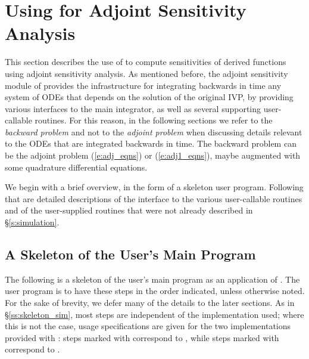 \section{Using {\cvodes} for Adjoint Sensitivity Analysis}\label{s:adjoint}

This section describes the use of {\cvodes} to compute sensitivities of derived 
functions using adjoint sensitivity analysis. As mentioned before, the adjoint
sensitivity module of {\cvodes} provides the infrastructure for integrating
backwards in time any system of ODEs that depends on the solution of the original
IVP, by providing various interfaces to the main {\cvodes} integrator, as well 
as several supporting user-callable routines. For this reason, in the following
sections we refer to the {\em backward problem} and not to the 
{\em adjoint problem} when discussing details relevant to the ODEs that
are integrated backwards in  time. The backward problem can be the adjoint problem
(\ref{e:adj_eqns}) or (\ref{e:adj1_eqns}),
maybe augmented with some quadrature differential equations.

We begin with a brief overview, in the form of a skeleton user program.
Following that are detailed descriptions of the interface to the
various user-callable routines and of the user-supplied routines that were not already
described in \S\ref{s:simulation}.
\subsection{A Skeleton of the User's Main Program}\label{ss:skeleton_adj}

The following is a skeleton of the user's main program as an application of
{\cvodes}. The user program is to have these steps in the order indicated, 
unless otherwise noted. For the sake of brevity, we defer many of the details to 
the later sections.
As in \S\ref{ss:skeleton_sim}, most steps are independent of the {\nvector}
implementation used; where this is not the case, usage specifications are given for the
two implementations provided with {\cvodes}: steps marked with {\p} correspond to 
{\nvecp}, while steps marked with {\s} correspond to {\nvecs}.

